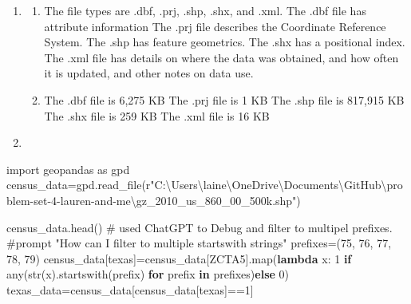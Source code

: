 \documentclass[
  letterpaper,
  DIV=11,
  numbers=noendperiod]{scrartcl}
\newenvironment{Shaded}{\begin{snugshade}}{\end{snugshade}}
\newcommand{\BuiltInTok}[1]{\textcolor[rgb]{0.00,0.23,0.31}{#1}}
\newcommand{\CommentTok}[1]{\textcolor[rgb]{0.37,0.37,0.37}{#1}}
\newcommand{\ControlFlowTok}[1]{\textcolor[rgb]{0.00,0.23,0.31}{\textbf{#1}}}
\newcommand{\DecValTok}[1]{\textcolor[rgb]{0.68,0.00,0.00}{#1}}
\newcommand{\ImportTok}[1]{\textcolor[rgb]{0.00,0.46,0.62}{#1}}
\newcommand{\KeywordTok}[1]{\textcolor[rgb]{0.00,0.23,0.31}{\textbf{#1}}}
\newcommand{\NormalTok}[1]{\textcolor[rgb]{0.00,0.23,0.31}{#1}}
\newcommand{\OperatorTok}[1]{\textcolor[rgb]{0.37,0.37,0.37}{#1}}
\newcommand{\StringTok}[1]{\textcolor[rgb]{0.13,0.47,0.30}{#1}}
\newcommand{\VerbatimStringTok}[1]{\textcolor[rgb]{0.13,0.47,0.30}{#1}}
\begin{document}
\begin{enumerate}
\def\labelenumi{\arabic{enumi}.}
\item
  \begin{enumerate}
  \def\labelenumii{\alph{enumii}.}
  \item
    The file types are .dbf, .prj, .shp, .shx, and .xml. The .dbf file
    has attribute information The .prj file describes the Coordinate
    Reference System. The .shp has feature geometrics. The .shx has a
    positional index. The .xml file has details on where the data was
    obtained, and how often it is updated, and other notes on data use.
  \item
    The .dbf file is 6,275 KB The .prj file is 1 KB The .shp file is
    817,915 KB The .shx file is 259 KB The .xml file is 16 KB
  \end{enumerate}
\item
\end{enumerate}

\begin{Shaded}
\begin{Highlighting}[]
\ImportTok{import}\NormalTok{ geopandas }\ImportTok{as}\NormalTok{ gpd}
\NormalTok{census\_data}\OperatorTok{=}\NormalTok{gpd.read\_file(}\VerbatimStringTok{r"C:\textbackslash{}Users\textbackslash{}laine\textbackslash{}OneDrive\textbackslash{}Documents\textbackslash{}GitHub\textbackslash{}problem{-}set{-}4{-}lauren{-}and{-}me\textbackslash{}gz\_2010\_us\_860\_00\_500k.shp"}\NormalTok{)}
\end{Highlighting}
\end{Shaded}

\begin{Shaded}
\begin{Highlighting}[]
\NormalTok{census\_data.head()}
\CommentTok{\# used ChatGPT to Debug and filter to multipel prefixes. }
\CommentTok{\#prompt "How can I filter to multiple startswith strings"}
\NormalTok{prefixes}\OperatorTok{=}\NormalTok{(}\StringTok{\textquotesingle{}75\textquotesingle{}}\NormalTok{, }\StringTok{\textquotesingle{}76\textquotesingle{}}\NormalTok{, }\StringTok{\textquotesingle{}77\textquotesingle{}}\NormalTok{, }\StringTok{\textquotesingle{}78\textquotesingle{}}\NormalTok{, }\StringTok{\textquotesingle{}79\textquotesingle{}}\NormalTok{)}
\NormalTok{census\_data[}\StringTok{\textquotesingle{}texas\textquotesingle{}}\NormalTok{]}\OperatorTok{=}\NormalTok{census\_data[}\StringTok{\textquotesingle{}ZCTA5\textquotesingle{}}\NormalTok{].}\BuiltInTok{map}\NormalTok{(}\KeywordTok{lambda}\NormalTok{ x: }\DecValTok{1} \ControlFlowTok{if} \BuiltInTok{any}\NormalTok{(}\BuiltInTok{str}\NormalTok{(x).startswith(prefix) }\ControlFlowTok{for}\NormalTok{ prefix }\KeywordTok{in}\NormalTok{ prefixes)}\ControlFlowTok{else} \DecValTok{0}\NormalTok{)}
\NormalTok{texas\_data}\OperatorTok{=}\NormalTok{census\_data[census\_data[}\StringTok{\textquotesingle{}texas\textquotesingle{}}\NormalTok{]}\OperatorTok{==}\DecValTok{1}\NormalTok{]}
\end{Highlighting}
\end{Shaded}
\end{document}
